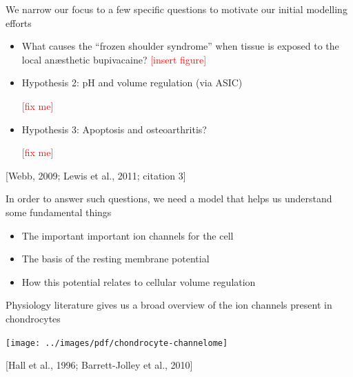 \documentclass[ignorenonframetext]{beamer}
\newcommand{\references}[1] {
  \begin{flushright}
    \scriptsize [#1] \normalsize
  \end{flushright}
}
\newcommand{\addfigure} {
  \scriptsize
  \textcolor{red}{[insert figure]}
  \normalsize
}
\newcommand{\fixme} {
  \scriptsize
  \textcolor{red}{[fix me]}
  \normalsize
}
\begin{document}
\begin{frame}{We narrow our focus to a few specific questions to
    motivate our initial modelling efforts}

  \begin{itemize}
  \item<1->[$\bigstar$] What causes the ``frozen shoulder syndrome''
    when tissue is exposed to the local an\ae{}sthetic
    bupivacaine?\addfigure\\[0.5cm]
    \pause
  \item<2-> Hypothesis 2: pH and volume regulation (via ASIC)
    \fixme\\[0.5cm]
  \item<2-> Hypothesis 3: Apoptosis and osteoarthritis?
    \fixme\\[0.5cm]
  \end{itemize}
  \references{Webb, 2009; Lewis et al., 2011; citation 3}

\end{frame}

\begin{frame}{In order to answer such questions, we need a model that
    helps us understand some fundamental things}
  \begin{itemize}
  \item The important important ion channels for the cell\\[0.5cm]
  \item The basis of the resting membrane potential\\[0.5cm]
  \item How this potential relates to cellular volume regulation\\[0.5cm]
  \end{itemize}
\end{frame}

%
%
%

\begin{frame}{Physiology literature gives us a broad overview of the
    ion channels present in chondrocytes}

  \vspace{0.4cm}
  \texttt{[image: ../images/pdf/chondrocyte-channelome]}

  \references{Hall et al., 1996; Barrett-Jolley et al., 2010}

\end{frame}
\end{document}
